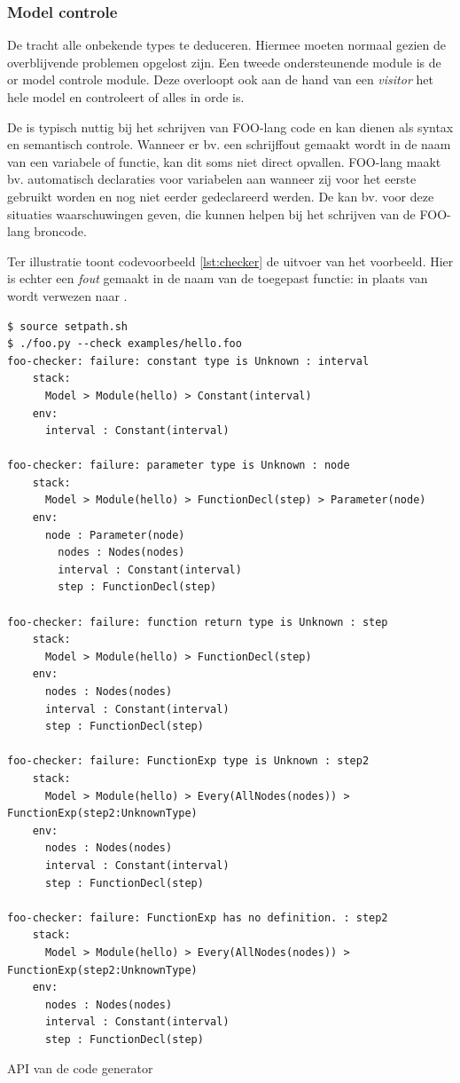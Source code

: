 \subsubsection{Model controle}

De  tracht alle onbekende types te deduceren. Hiermee
moeten normaal gezien de overblijvende problemen opgelost zijn. Een tweede
ondersteunende module is de  or model controle module. Deze
overloopt ook aan de hand van een \emph{visitor} het hele model en controleert
of alles in orde is.

De  is typisch nuttig bij het schrijven van FOO-lang code
en kan dienen als syntax en semantisch controle. Wanneer er bv. een schrijffout
gemaakt wordt in de naam van een variabele of functie, kan dit soms niet direct
opvallen. FOO-lang maakt bv. automatisch declaraties voor variabelen aan
wanneer zij voor het eerste gebruikt worden en nog niet eerder gedeclareerd
werden. De  kan bv. voor deze situaties waarschuwingen
geven, die kunnen helpen bij het schrijven van de FOO-lang broncode.

Ter illustratie toont codevoorbeeld \ref{lst:checker} de uitvoer van het
 voorbeeld. Hier is echter een \emph{fout} gemaakt in de naam
van de toegepast functie: in plaats van  wordt verwezen naar
.

\begin{listing}[ht]
  \begin{verbatim}
$ source setpath.sh
$ ./foo.py --check examples/hello.foo
foo-checker: failure: constant type is Unknown : interval
    stack:
      Model > Module(hello) > Constant(interval)
    env:
      interval : Constant(interval)
      
foo-checker: failure: parameter type is Unknown : node
    stack:
      Model > Module(hello) > FunctionDecl(step) > Parameter(node)
    env:
      node : Parameter(node)
        nodes : Nodes(nodes)
        interval : Constant(interval)
        step : FunctionDecl(step)
      
foo-checker: failure: function return type is Unknown : step
    stack:
      Model > Module(hello) > FunctionDecl(step)
    env:
      nodes : Nodes(nodes)
      interval : Constant(interval)
      step : FunctionDecl(step)
      
foo-checker: failure: FunctionExp type is Unknown : step2
    stack:
      Model > Module(hello) > Every(AllNodes(nodes)) > FunctionExp(step2:UnknownType)
    env:
      nodes : Nodes(nodes)
      interval : Constant(interval)
      step : FunctionDecl(step)
      
foo-checker: failure: FunctionExp has no definition. : step2
    stack:
      Model > Module(hello) > Every(AllNodes(nodes)) > FunctionExp(step2:UnknownType)
    env:
      nodes : Nodes(nodes)
      interval : Constant(interval)
      step : FunctionDecl(step)
  \end{verbatim}
  \vspace{-5mm}
  \caption{API van de code generator}
  \label{lst:codegen-api}
\end{listing}

